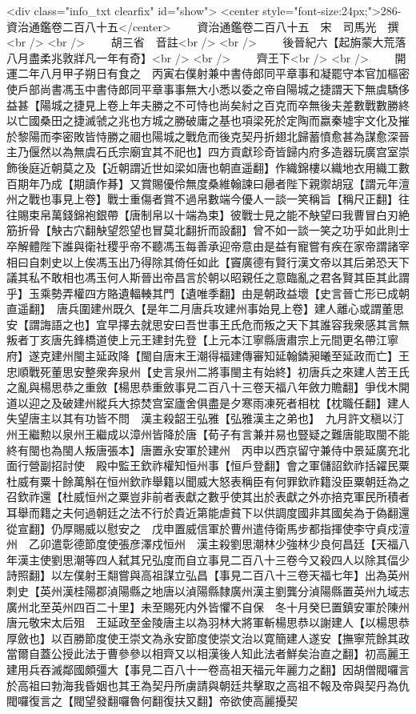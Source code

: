 <div class="info_txt clearfix" id="show">
<center style="font-size:24px;">286-資治通鑑卷二百八十五</center>
  　　資治通鑑卷二百八十五　宋　司馬光　撰<br />
<br />
　　胡三省　音註<br />
<br />
　　後晉紀六【起旃蒙大荒落八月盡柔兆敦牂凡一年有奇】<br />
<br />
　　齊王下<br />
<br />
　　開運二年八月甲子朔日有食之　丙寅右僕射兼中書侍郎同平章事和凝罷守本官加樞密使戶部尚書馮玉中書侍郎同平章事事無大小悉以委之帝自陽城之捷謂天下無虞驕侈益甚【陽城之捷見上卷上年夫勝之不可恃也尚矣紂之百克而卒無後夫差數戰數勝終以亡國桑田之捷滅虢之兆也方城之勝破庸之基也項梁死於定陶而嬴秦墟宇文化及摧於黎陽而李密敗皆恃勝之祻也陽城之戰危而後克契丹折翅北歸蓄憤愈甚為謀愈深晉主乃偃然以為無虞石氏宗廟宜其不祀也】四方貢獻珍奇皆歸内府多造器玩廣宫室崇飾後庭近朝莫之及【近朝謂近世如梁如唐也朝直遥翻】作織錦樓以織地衣用織工數百期年乃成【期讀作朞】又賞賜優伶無度桑維翰諫曰曏者陛下親禦胡寇【謂元年澶州之戰也事見上卷】戰士重傷者賞不過帛數端今優人一談一笑稱旨【稱尺正翻】往往賜束帛萬錢錦袍銀帶【唐制帛以十端為束】彼戰士見之能不觖望曰我曹冒白刃絶筋折骨【觖古穴翻觖望怨望也冒莫北翻折而設翻】曾不如一談一笑之功乎如此則士卒解體陛下誰與衛社稷乎帝不聽馮玉每善承迎帝意由是益有寵嘗有疾在家帝謂諸宰相曰自刺史以上俟馮玉出乃得除其倚任如此【竇廣德有賢行漢文帝以其后弟恐天下議其私不敢相也馮玉何人斯晉出帝昌言於朝以昭親任之意臨亂之君各賢其臣其此謂乎】玉乘勢弄權四方賂遺輻輳其門【遺唯季翻】由是朝政益壞【史言晉亡形已成朝直遥翻】　唐兵圍建州既久【是年二月唐兵攻建州事始見上卷】建人離心或謂董思安【謂誨語之也】宜早擇去就思安曰吾世事王氏危而叛之天下其誰容我衆感其言無叛者丁亥唐先鋒橋道使上元王建封先登【上元本江寧縣唐肅宗上元間更名帶江寧府】遂克建州閩主延政降【閩自唐末王潮得福建傳審知延翰鏻昶曦至延政而亡】王忠順戰死董思安整衆奔泉州【史言泉州二將事閩主有始終】初唐兵之來建人苦王氏之亂與楊思恭之重斂【楊思恭重斂事見二百八十三卷天福八年斂力贍翻】爭伐木開道以迎之及破建州縱兵大掠焚宫室廬舍俱盡是夕寒雨凍死者相枕【枕職任翻】建人失望唐主以其有功皆不問　漢主殺韶王弘雅【弘雅漢主之弟也】　九月許文稹以汀州王繼勲以泉州王繼成以漳州皆降於唐【荀子有言兼并易也豎疑之難唐能取閩不能終有閩也為閩人叛唐張本】唐置永安軍於建州　丙申以西京留守兼侍中景延廣充北面行營副招討使　殿中監王欽祚權知恒州事【恒戶登翻】會之軍儲詔欽祚括糴民粟杜威有粟十餘萬斛在恒州欽祚舉籍以聞威大怒表稱臣有何罪欽祚籍没臣粟朝廷為之召欽祚還【杜威恒州之粟豈非前者表獻之數乎使其出於表獻之外亦掊克軍民所積者耳舉而籍之夫何過朝廷之法不行於貴近第能虐貧下以供調度國非其國矣為于偽翻還從宣翻】仍厚賜威以慰安之　戊申置威信軍於曹州遣侍衛馬步都指揮使李守貞戍澶州　乙卯遣彰德節度使張彦澤戍恒州　漢主殺劉思潮林少強林少良何昌廷【天福八年漢主使劉思潮等四人弑其兄弘度而自立事見二百八十三卷今又殺四人以除其偪少詩照翻】以左僕射王翷嘗與高祖謀立弘昌【事見二百八十三卷天福七年】出為英州刺史【英州漢桂陽郡湞陽縣之地唐以湞陽縣隸廣州漢主劉龔分湞陽縣置英州九域志廣州北至英州四百二十里】未至賜死内外皆懼不自保　冬十月癸巳置鎮安軍於陳州　唐元敬宋太后殂　王延政至金陵唐主以為羽林大將軍斬楊思恭以謝建人【以楊思恭厚斂也】以百勝節度使王崇文為永安節度使崇文治以寛簡建人遂安【撫寧荒餘其政當爾自蓋公授此法于曹參參以相齊又以相漢後人知此法者鮮矣治直之翻】初高麗王建用兵吞滅鄰國頗彊大【事見二百八十一卷高祖天福元年麗力之翻】因胡僧閥囉言於高祖曰勃海我昏姻也其王為契丹所虜請與朝廷共擊取之高祖不報及帝與契丹為仇閥囉復言之【閥望發翻囉魯何翻復扶又翻】帝欲使高麗擾契